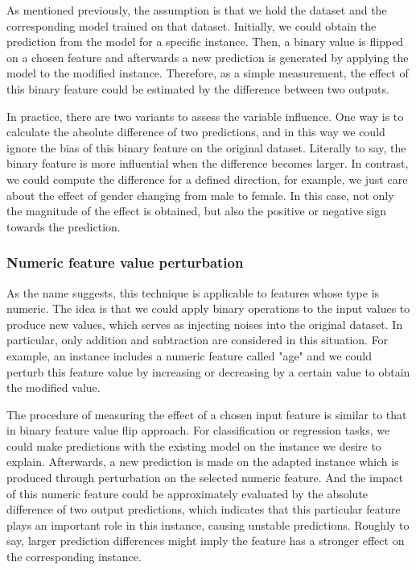 As mentioned previously, the assumption is that we hold the dataset and the corresponding model trained on that dataset. Initially, we could obtain the prediction from the model for a specific instance. Then, a binary value is flipped on a chosen feature and afterwards a new prediction is generated by applying the model to the modified instance. Therefore, as a simple measurement, the effect of this binary feature could be estimated by the difference between two outputs. 

In practice, there are two variants to assess the variable influence. One way is to calculate the absolute difference of two predictions, and in this way we could ignore the bias of this binary feature on the original dataset. Literally to say, the binary feature is more influential when the difference becomes larger. In contrast, we could compute the difference for a defined direction, for example, we just care about the effect of gender changing from male to female. In this case, not only the magnitude of the effect is obtained, but also the positive or negative sign towards the prediction.  

\subsubsection{Numeric feature value perturbation}

As the name suggests, this technique is applicable to features whose type is numeric. The idea is that we could apply binary operations to the input values to produce new values, which serves as injecting noises into the original dataset. In particular, only addition and subtraction are considered in this situation. For example, an instance includes a numeric feature called "age" and we could perturb this feature value by increasing or decreasing by a certain value to obtain the modified value. 

The procedure of measuring the effect of a chosen input feature is similar to that in binary feature value flip approach. For classification or regression tasks, we could make predictions with the existing model on the instance we desire to explain. Afterwards, a new prediction is made on the adapted instance which is produced through perturbation on the selected numeric feature. And the impact of this numeric feature could be approximately evaluated by the absolute difference of two output predictions, which indicates that this particular feature plays an important role in this instance, causing unstable predictions. Roughly to say, larger prediction differences might imply the feature has a stronger effect on the corresponding instance. 


